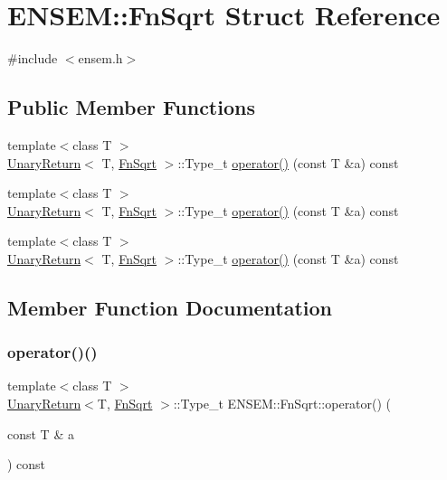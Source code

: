 \hypertarget{structENSEM_1_1FnSqrt}{}\section{E\+N\+S\+EM\+:\+:Fn\+Sqrt Struct Reference}
\label{structENSEM_1_1FnSqrt}


{\ttfamily \#include $<$ensem.\+h$>$}

\subsection*{Public Member Functions}
\begin{DoxyCompactItemize}
\item 
{\footnotesize template$<$class T $>$ }\\\mbox{\hyperlink{structENSEM_1_1UnaryReturn}{Unary\+Return}}$<$ T, \mbox{\hyperlink{structENSEM_1_1FnSqrt}{Fn\+Sqrt}} $>$\+::Type\+\_\+t \mbox{\hyperlink{structENSEM_1_1FnSqrt_acec9d842c8abf3aff70bc3c16a5473ce}{operator()}} (const T \&a) const
\item 
{\footnotesize template$<$class T $>$ }\\\mbox{\hyperlink{structENSEM_1_1UnaryReturn}{Unary\+Return}}$<$ T, \mbox{\hyperlink{structENSEM_1_1FnSqrt}{Fn\+Sqrt}} $>$\+::Type\+\_\+t \mbox{\hyperlink{structENSEM_1_1FnSqrt_acec9d842c8abf3aff70bc3c16a5473ce}{operator()}} (const T \&a) const
\item 
{\footnotesize template$<$class T $>$ }\\\mbox{\hyperlink{structENSEM_1_1UnaryReturn}{Unary\+Return}}$<$ T, \mbox{\hyperlink{structENSEM_1_1FnSqrt}{Fn\+Sqrt}} $>$\+::Type\+\_\+t \mbox{\hyperlink{structENSEM_1_1FnSqrt_acec9d842c8abf3aff70bc3c16a5473ce}{operator()}} (const T \&a) const
\end{DoxyCompactItemize}


\subsection{Member Function Documentation}
\mbox{\label{structENSEM_1_1FnSqrt_acec9d842c8abf3aff70bc3c16a5473ce}} 
\subsubsection{\texorpdfstring{operator()()}{operator()()}\hspace{0.1cm}{\footnotesize\ttfamily [1/3]}}
{\footnotesize\ttfamily template$<$class T $>$ \\
\mbox{\hyperlink{structENSEM_1_1UnaryReturn}{Unary\+Return}}$<$T, \mbox{\hyperlink{structENSEM_1_1FnSqrt}{Fn\+Sqrt}} $>$\+::Type\+\_\+t E\+N\+S\+E\+M\+::\+Fn\+Sqrt\+::operator() (\begin{DoxyParamCaption}\item[{const T \&}]{a }\end{DoxyParamCaption}) const\hspace{0.3cm}{\ttfamily [inline]}}

